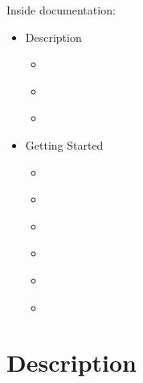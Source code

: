 \documentclass[letterpaper,10pt,english]{jupyterBook}
\begin{document}
\sphinxAtStartPar
Inside documentation:
\begin{itemize}
\item {} 
\sphinxAtStartPar
Description

\begin{itemize}
\item {} 
\sphinxAtStartPar
{\hyperref[\detokenize{chapters/description/theory::doc}]{}}

\item {} 
\sphinxAtStartPar
{\hyperref[\detokenize{chapters/description/coordinates::doc}]{}}

\item {} 
\sphinxAtStartPar
{\hyperref[\detokenize{chapters/description/technology::doc}]{}}

\end{itemize}
\end{itemize}
\begin{itemize}
\item {} 
\sphinxAtStartPar
Getting Started

\begin{itemize}
\item {} 
\sphinxAtStartPar
{\hyperref[\detokenize{chapters/start/installation::doc}]{}}

\item {} 
\sphinxAtStartPar
{\hyperref[\detokenize{chapters/usage/usage::doc}]{}}

\item {} 
\sphinxAtStartPar
{\hyperref[\detokenize{chapters/validation/validation::doc}]{}}

\item {} 
\sphinxAtStartPar
{\hyperref[\detokenize{chapters/future::doc}]{}}

\item {} 
\sphinxAtStartPar
{\hyperref[\detokenize{chapters/conclusion::doc}]{}}

\item {} 
\sphinxAtStartPar
{\hyperref[\detokenize{chapters/bibliography::doc}]{}}

\end{itemize}
\end{itemize}

\sphinxstepscope


\part{Description}
\end{document}
